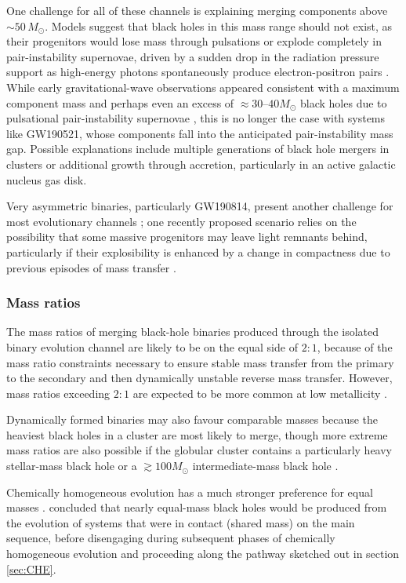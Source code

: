 \documentclass[review]{elsarticle}
\begin{document}
One challenge for all of these channels is explaining merging components above $\sim 50\, M_\odot$.  Models suggest that black holes in this mass range should not exist, as their progenitors would lose mass through pulsations or explode completely in pair-instability supernovae, driven by a sudden drop in the radiation pressure support as high-energy photons spontaneously produce electron-positron pairs  \citep[e.g.,][]{Woosley:2017,Farmer:2019}.  While early gravitational-wave observations appeared consistent with a maximum component mass and perhaps even an excess of $\approx 30$--$40 M_\odot$ black holes due to pulsational pair-instability supernovae \citep[e.g.,][]{Stevenson:2019}, this is no longer the case with systems like GW190521, whose components fall into the anticipated pair-instability mass gap.  Possible explanations \citep{GW190521:astro} include multiple generations of black hole mergers in clusters \citep{Rodriguez:2019} or additional growth through accretion, particularly in an active galactic nucleus gas disk.

Very asymmetric binaries, particularly GW190814, present another challenge for most evolutionary channels \citep{Zevin:2020,Mandel:2020}; one recently proposed scenario relies on the possibility that some massive progenitors may leave light remnants behind, particularly if their explosibility is enhanced by a change in compactness due to previous episodes of mass transfer \citep{Antoniadis:2021}.  

\subsubsection{Mass ratios}
The mass ratios of merging black-hole binaries produced through the isolated binary evolution channel are likely to be on the equal side of $2:1$, because of the mass ratio constraints necessary to ensure stable mass transfer from the primary to the secondary and then dynamically unstable reverse mass transfer. However, mass ratios exceeding $2:1$ are expected to be more common at low metallicity \citep{Dominik:2012,Stevenson:2017}.

Dynamically formed binaries may also favour comparable masses because the heaviest black holes in a cluster are most likely to merge, though more extreme mass ratios are also possible if the globular cluster contains a particularly heavy stellar-mass black hole or a $\gtrsim 100 M_\odot$ intermediate-mass black hole \citep{Mandel:2008,Belczynski:2014VMS}. 

Chemically homogeneous evolution has a much stronger preference for equal masses \citep{MandeldeMink:2016}.  \citet{Marchant:2016,Riley:2020} concluded that nearly equal-mass black holes would be produced from the evolution of systems that were in contact (shared mass) on the main sequence, before disengaging during subsequent phases of chemically homogeneous evolution and proceeding along the pathway sketched out in section \ref{sec:CHE}. 
\end{document}
